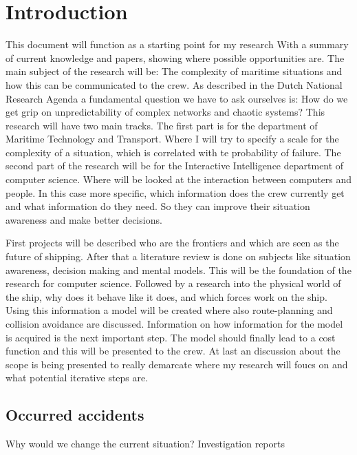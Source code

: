 \section*{Introduction}
\label{sec:introduction}

\noindent This document will function as a starting point for my research With a summary of current knowledge and papers, showing where possible opportunities are. The main subject of the research will be: The complexity of maritime situations and how this can be communicated to the crew.
As described in the Dutch National Research Agenda a fundamental question we have to ask ourselves is: How do we get grip on unpredictability of complex networks and chaotic systems?  %
This research will have two main tracks. The first part is for the department of Maritime Technology and Transport. Where I will try to specify a scale for the complexity of a situation, which is correlated with te probability of failure. The second part of the research will be for the Interactive Intelligence department of computer science. Where will be looked at the interaction between computers and people. In this case more specific, which information does the crew currently get and what information do they need. So they can improve their situation awareness and make better decisions.

First projects will be described who are the frontiers and which are seen as the future of shipping.
After that a literature review is done on subjects like situation awareness, decision making and mental models. This will be the foundation of the research for computer science. 
Followed by a research into the physical world of the ship, why does it behave like it does, and which forces work on the ship. Using this information a model will be created where also route-planning and collision avoidance are discussed. 
Information on how information for the model is acquired is the next important step. The model should finally lead to a cost function and this will be presented to the crew. 
At last an discussion about the scope is being presented to really demarcate where my research will foucs on and what potential iterative steps are. 

\subsection*{Occurred accidents}
Why would we change the current situation?
Investigation reports